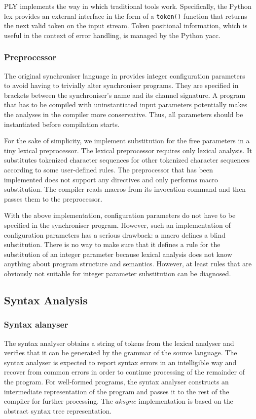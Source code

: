 PLY implements the way in which traditional tools work. Specifically, the Python lex provides an external interface in the form of a \texttt{token()} function that returns the next valid token on the input stream. Token positional information, which is useful in the context of error handling, is managed by the Python yacc.

  \subsubsection{Preprocessor}
The original synchroniser language in \cite{astrakahn} provides integer configuration parameters to avoid having to trivially alter synchroniser programs. They are specified in brackets between the synchroniser's name and its channel signature. A program that has to be compiled with uninstantiated input parameters potentially makes the analyses in the compiler more conservative. Thus, all parameters should be instantiated before compilation starts.

For the sake of simplicity, we implement substitution for the free parameters in a tiny lexical preprocessor. The lexical preprocessor requires only lexical analysis. It substitutes tokenized character sequences for other tokenized character sequences according to some user-defined rules. The preprocessor that has been implemented does not support any directives and only performs macro substitution. The compiler reads macros from its invocation command and then passes them to the preprocessor.

With the above implementation, configuration parameters do not have to be specified in the synchroniser program. However, such an implementation of configuration parameters has a serious drawback: a macro defines a blind substitution. There is no way to make sure that it defines a rule for the substitution of an integer parameter because lexical analysis does not know anything about program structure and semantics. However, at least rules that are obviously not suitable for integer parameter substitution can be diagnosed.


\subsection{Syntax Analysis}
  \subsubsection{Syntax alanyser}
The syntax analyser obtains a string of tokens from the lexical analyser and verifies that it can be generated by the grammar of the source language. The syntax analyser is expected to report syntax errors in an intelligible way and recover from common errors in order to continue processing of the remainder of the program. For well-formed programs, the syntax analyser constructs an intermediate representation of the program and passes it to the rest of the compiler for further processing. The $aksync$ implementation is based on the abstract syntax tree representation.

